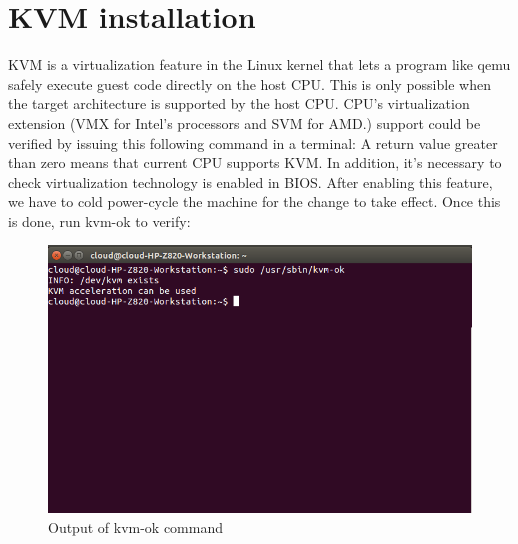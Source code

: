 \section{KVM installation}
KVM is a virtualization feature in the Linux kernel that lets a program like qemu safely execute guest code directly on the host CPU. 
This is only possible when the target architecture is supported by the host CPU. 
CPU’s virtualization extension (VMX for Intel’s processors and SVM for AMD.) support could be verified by issuing this following command in a terminal:
A return value greater than zero means that current CPU supports KVM. In addition, it’s necessary to check virtualization technology is enabled in BIOS. 
After enabling this feature, we have to cold power-cycle the machine for the change to take effect. 
Once this is done, run kvm-ok to verify:  
\begin{figure}[htbp]
	\centering
		\includegraphics[scale=0.7]{Figures/Figure11.png}
	\caption[Output of kvm-ok command]{Output of kvm-ok command}
	\label{fig:Output of kvm-ok command}
\end{figure}

